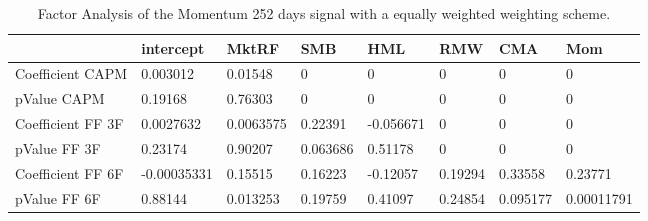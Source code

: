 \begin{table}[H]
\centering
\begin{tabular}{llllllll}
\hline& intercept & MktRF & SMB & HML & RMW & CMA & Mom \\ 
\hline 
Coefficient CAPM & 0.003012 & 0.01548 & 0 & 0 & 0 & 0 & 0 \\ 
pValue CAPM & 0.19168 & 0.76303 & 0 & 0 & 0 & 0 & 0 \\ 
Coefficient FF 3F & 0.0027632 & 0.0063575 & 0.22391 & -0.056671 & 0 & 0 & 0 \\ 
pValue FF 3F & 0.23174 & 0.90207 & 0.063686 & 0.51178 & 0 & 0 & 0 \\ 
Coefficient FF 6F & -0.00035331 & 0.15515 & 0.16223 & -0.12057 & 0.19294 & 0.33558 & 0.23771 \\ 
pValue FF 6F & 0.88144 & 0.013253 & 0.19759 & 0.41097 & 0.24854 & 0.095177 & 0.00011791 \\ 
\hline
\end{tabular}
\caption{Factor Analysis of the Momentum 252 days signal with a equally weighted weighting scheme.}
\label{MOM252EW_FACTOR}
\end{table}